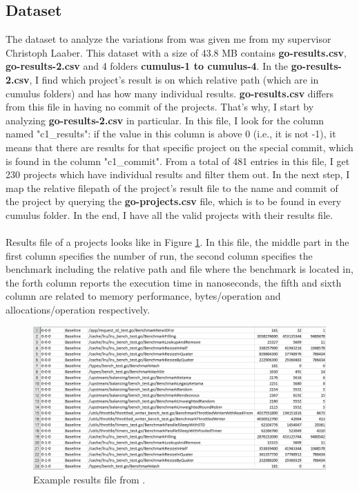 \documentclass{seal_thesis}
\begin{document}
\subsection{Dataset}

The dataset to analyze the variations from was given me from my supervisor Christoph Laaber. This dataset with a size of 43.8 MB contains \textbf{go-results.csv}, \textbf{go-results-2.csv} and 4 folders \textbf{cumulus-1 to cumulus-4}. In the \textbf{go-results-2.csv}, I find which project's result is on which relative path (which are in cumulus folders) and has how many individual results. \textbf{go-results.csv} differs from this file in having no commit of the projects. That's why, I start by analyzing \textbf{go-results-2.csv} in particular. In this file, I look for the column named "c1\_results": if the value in this column is above 0 (i.e., it is not -1), it means that there are results for that specific project on the special commit, which is found in the column "c1\_commit". From a total of 481 entries in this file, I get 230 projects which have individual results and filter them out. In the next step, I map the relative filepath of the project's result file to the name and commit of the project by querying the \textbf{go-projects.csv} file, which is to be found in every cumulus folder. In the end, I have all the valid projects with their results file.\\
\\
Results file of a projects looks like in Figure \ref{fig:exampleresults}. In this file, the middle part in the first column specifies the number of run, the second column specifies the benchmark including the relative path and file where the benchmark is located in, the forth column reports the execution time in nanoseconds, the fifth and sixth column are related to memory performance, bytes/operation and allocations/operation respectively.
 
\begin{figure}[H]
	\centering
	\includegraphics[width=\linewidth]{exampleresults}
	\caption{Example results file from \cite{ironsmile/nedomi}.}
	\label{fig:exampleresults}
\end{figure}
 
\end{document}

